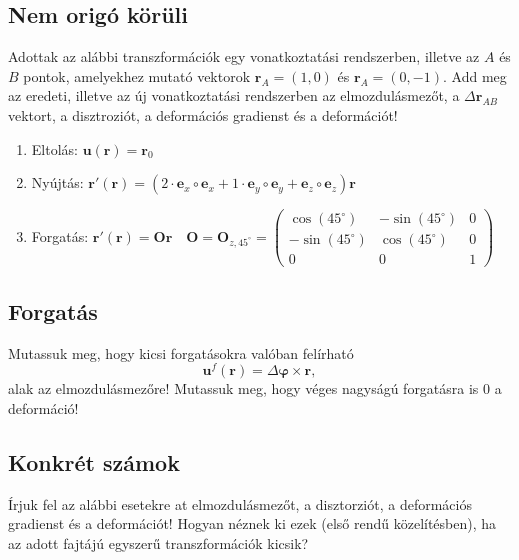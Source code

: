 \documentclass[12pt,a4paper]{scrartcl}
\let\mathbf\bm
\begin{document}
\iffalse
\subsection{Nem origó körüli}
Adottak az alábbi transzformációk egy vonatkoztatási rendszerben, illetve  az $A$ és $B$ pontok, amelyekhez mutató vektorok ${{\mathbf{r}}_A} = \left( {1,0} \right)$ és ${{\mathbf{r}}_A} = \left( {0, - 1} \right)$. Add meg az eredeti, illetve az új vonatkoztatási rendszerben az elmozdulásmezőt, a $\Delta {{\mathbf{r}}_{AB}}$ vektort, a disztroziót, a deformációs gradienst és a deformációt!
\begin{enumerate}
\item Eltolás: ${\mathbf{u}}\left( {\mathbf{r}} \right) = {{\mathbf{r}}_0}$
\item Nyújtás: ${\mathbf{r}}'\left( {\mathbf{r}} \right) = \left( {2 \cdot {{\mathbf{e}}_x} \circ {{\mathbf{e}}_x} + 1 \cdot {{\mathbf{e}}_y} \circ {{\mathbf{e}}_y} + {{\mathbf{e}}_z} \circ {{\mathbf{e}}_z}} \right){\mathbf{r}}$
\item Forgatás: ${\mathbf{r}}'\left( {\mathbf{r}} \right) = {\mathbf{Or}}\quad {\mathbf{O}} = {{\mathbf{O}}_{z,45^\circ }} = \left( {\begin{array}{*{20}{c}}
  {\cos \left( {45^\circ } \right)}&{ - \sin \left( {45^\circ } \right)}&0 \\ 
  { - \sin \left( {45^\circ } \right)}&{\cos \left( {45^\circ } \right)}&0 \\ 
  0&0&1 
\end{array}} \right)$
\end{enumerate}

\subsection{Forgatás}
Mutassuk meg, hogy kicsi forgatásokra valóban felírható \begin{equation} \label{eq:inf_forgat}
{{\mathbf{u}}^f}\left( {\mathbf{r}} \right) = \Delta {\mathbf{\varphi }} \times {\mathbf{r}},
\end{equation}
alak az elmozdulásmezőre! Mutassuk meg, hogy véges nagyságú forgatásra is $0$ a deformáció!


\subsection{Konkrét számok}
Írjuk fel az alábbi esetekre at elmozdulásmezőt, a disztorziót, a deformációs gradienst és a deformációt! Hogyan néznek ki ezek (első rendű közelítésben), ha az adott fajtájú egyszerű transzformációk kicsik?
\end{document}
